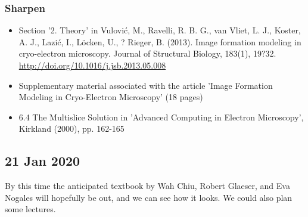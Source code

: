 \documentclass[11pt, oneside]{article}   	%
\begin{document}
\subsubsection{Sharpen}
\begin{itemize}
	\item Section '2. Theory' in Vulovi\'{c}, M., Ravelli, R. B. G., van Vliet, L. J., Koster, A. J., Lazi\'{c}, I., L\"ocken, U., ? Rieger, B. (2013). Image formation modeling in cryo-electron microscopy. Journal of Structural Biology, 183(1), 19?32. \url{http://doi.org/10.1016/j.jsb.2013.05.008}
	\item Supplementary material associated with the article 'Image Formation Modeling in Cryo-Electron Microscopy' (18 pages)
	\item 6.4 The Multislice Solution in 'Advanced Computing in Electron Microscopy', Kirkland (2000), pp. 162-165
\end{itemize}

\pagebreak
\subsection{21 Jan 2020}
By this time the anticipated textbook by Wah Chiu, Robert Glaeser, and Eva Nogales will hopefully be out, and we can see how it looks. We could also plan some lectures.
\end{document}
